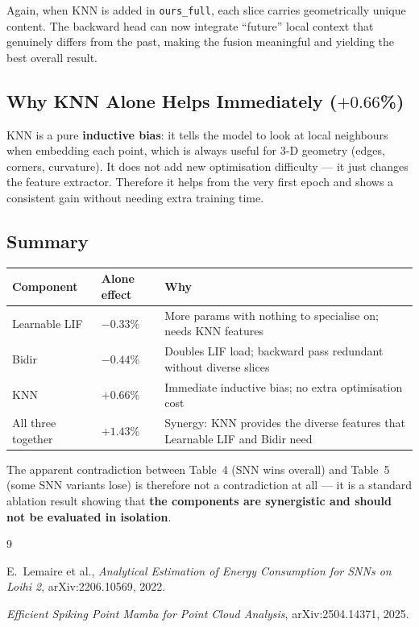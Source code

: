 \documentclass[11pt,a4paper]{article}
\begin{document}
Again, when KNN is added in \texttt{ours\_full}, each slice carries
geometrically unique content. The backward head can now integrate
``future'' local context that genuinely differs from the past, making
the fusion meaningful and yielding the best overall result.

\subsection{Why KNN Alone Helps Immediately ($+0.66$\%)}

KNN is a pure \textbf{inductive bias}: it tells the model to look at local
neighbours when embedding each point, which is always useful for 3-D geometry
(edges, corners, curvature). It does not add new optimisation difficulty ---
it just changes the feature extractor. Therefore it helps from the very first
epoch and shows a consistent gain without needing extra training time.

\subsection{Summary}

\begin{center}
\begin{tabular}{p{3.5cm}p{4cm}p{5cm}}
\toprule
Component & Alone effect & Why \\
\midrule
Learnable LIF & $-0.33$\% & More params with nothing to specialise on; needs KNN features \\
Bidir & $-0.44$\% & Doubles LIF load; backward pass redundant without diverse slices \\
KNN & $+0.66$\% & Immediate inductive bias; no extra optimisation cost \\
All three together & $+1.43$\% & Synergy: KNN provides the diverse features that Learnable LIF and Bidir need \\
\bottomrule
\end{tabular}
\end{center}

The apparent contradiction between Table~4 (SNN wins overall) and Table~5
(some SNN variants lose) is therefore not a contradiction at all --- it is a
standard ablation result showing that \textbf{the components are synergistic
and should not be evaluated in isolation}.

\begin{thebibliography}{9}

E.\ Lemaire et al.,
\textit{Analytical Estimation of Energy Consumption for SNNs on Loihi 2},
arXiv:2206.10569, 2022.

\textit{Efficient Spiking Point Mamba for Point Cloud Analysis},
arXiv:2504.14371, 2025.

\end{thebibliography}
\end{document}
